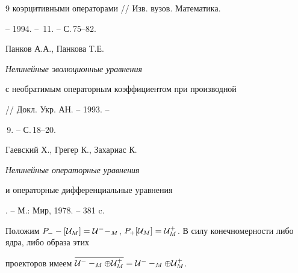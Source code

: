 \begin{thebibliography}{9}
{коэрцитивными операторами} // Изв. вузов. Математика.


-- 1994. -- \No\,11. -- С.\,75--82.




Панков А.А., Панкова Т.Е. {\it Нелинейные эволюционные уравнения


с необратимым операторным коэффициентом при производной}


// Докл. Укр. АН. -- 1993. --


\No\,9. -- С.\,18--20.




Гаевский Х., Грегер К., Захариас К. {\it Нелинейные операторные уравнения


и операторные дифференциальные уравнения}. -- М.: Мир, 1978. -- 381 c.





\end{thebibliography}





\vskip 2cm














\label{end}











Положим $P_-- [{\cal U}_M] = {\cal U}^--_M$, $P_+ [{\cal U}_M] =


{\cal U}^+_M$. В силу конечномерности либо ядра, либо образа этих


проекторов имеем $\overline{{\cal U}^--_M \oplus {\cal U}^+_M} =


{\cal U}^--_M \oplus {\cal U}^+_M$.




















